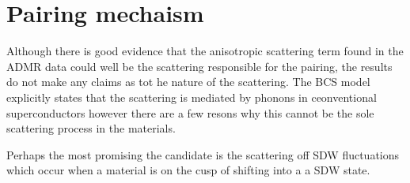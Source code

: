 \section{Pairing mechaism}
\label{Sec:Intro:PairingMechanism}

Although there is good evidence that the anisotropic scattering term found in the \ac{ADMR} data could well be the scattering responsible for the pairing, the results do not make any claims as tot he nature of the scattering. The \ac{BCS} model explicitly states that the scattering is mediated by phonons in ceonventional superconductors however there are a few resons why this cannot be the sole scattering process in the \highTc materials.


Perhaps the most promising the candidate is the scattering off \ac{SDW} fluctuations which occur when a material is on the cusp of shifting into a a \ac{SDW} state. 
